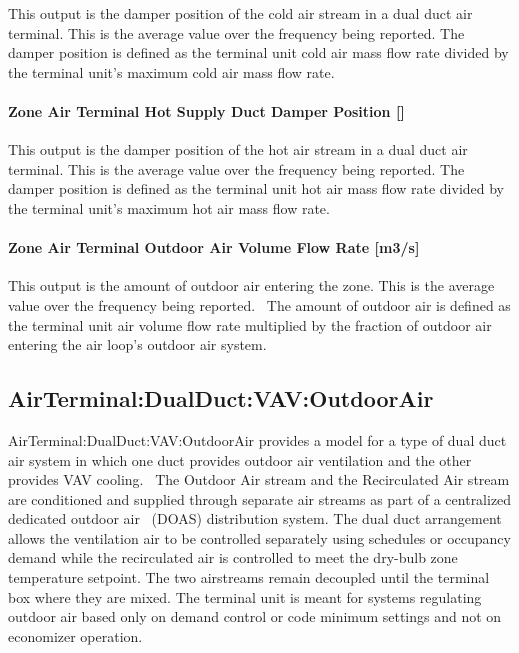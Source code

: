 This output is the damper position of the cold air stream in a dual duct air terminal. This is the average value over the frequency being reported. The damper position is defined as the terminal unit cold air mass flow rate divided by the terminal unit's maximum cold air mass flow rate.

\paragraph{\texorpdfstring{Zone Air Terminal Hot Supply Duct Damper Position {[]}}{Zone Air Terminal Hot Supply Duct Damper Position }}\label{zone-air-terminal-hot-supply-duct-damper-position-1}

This output is the damper position of the hot air stream in a dual duct air terminal. This is the average value over the frequency being reported. The damper position is defined as the terminal unit hot air mass flow rate divided by the terminal unit's maximum hot air mass flow rate.

\paragraph{Zone Air Terminal Outdoor Air Volume Flow Rate {[}m3/s{]}}\label{zone-air-terminal-outdoor-air-volume-flow-rate-m3s-2}

This output is the amount of outdoor air entering the zone. This is the average value over the frequency being reported.~ The amount of outdoor air is defined as the terminal unit air volume flow rate multiplied by the fraction of outdoor air entering the air loop's outdoor air system.

\subsection{AirTerminal:DualDuct:VAV:OutdoorAir}\label{airterminaldualductvavoutdoorair}

AirTerminal:DualDuct:VAV:OutdoorAir provides a model for a type of dual duct air system in which one duct provides outdoor air ventilation and the other provides VAV cooling.~ The Outdoor Air stream and the Recirculated Air stream are conditioned and supplied through separate air streams as part of a centralized dedicated outdoor air~ (DOAS) distribution system. The dual duct arrangement allows the ventilation air to be controlled separately using schedules or occupancy demand while the recirculated air is controlled to meet the dry-bulb zone temperature setpoint. The two airstreams remain decoupled until the terminal box where they are mixed. The terminal unit is meant for systems regulating outdoor air based only on demand control or code minimum settings and not on economizer operation.

